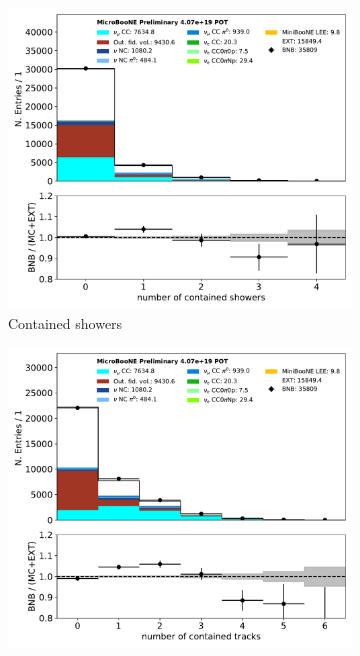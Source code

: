 \begin{figure}[H] 
\begin{center}
    \begin{subfigure}[b]{0.3\textwidth}
    \centering
    \includegraphics[width=1.00\textwidth]{nueselection/n_showers_contained_01132020_RUN1.pdf}
    \caption{\label{fig:nue:presel:nshower} Contained showers}
    \end{subfigure}
    \begin{subfigure}[b]{0.3\textwidth}
    \centering
    \includegraphics[width=1.00\textwidth]{nueselection/n_tracks_contained_01132020_RUN1.pdf}

\end{subfigure}
\end{center}
\end{figure}
